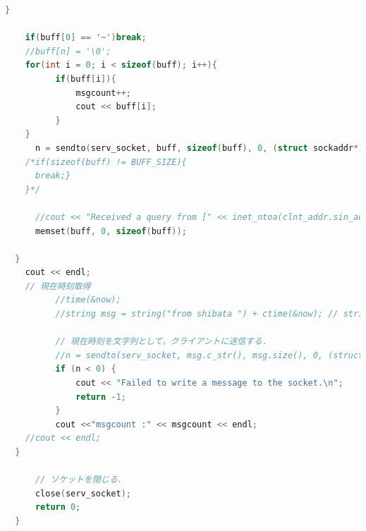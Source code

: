 \documentclass[fleqn, a4paper. 12pt]{ltjsarticle}
\begin{document}
\begin{lstlisting}[language=C++]
    }
    
    if(buff[0] == '~')break;
    //buff[n] = '\0';
    for(int i = 0; i < sizeof(buff); i++){
          if(buff[i]){
              msgcount++;
              cout << buff[i];
          }
    }
      n = sendto(serv_socket, buff, sizeof(buff), 0, (struct sockaddr*)&clnt_addr, sizeof(clnt_addr));
    /*if(sizeof(buff) != BUFF_SIZE){
      break;}
    }*/
  
      //cout << "Received a query from [" << inet_ntoa(clnt_addr.sin_addr) << ", " << htons(clnt_addr.sin_port) << "]" << endl;
      memset(buff, 0, sizeof(buff));
  
  }
    cout << endl;
    // 現在時刻取得
          //time(&now);
          //string msg = string("from shibata ") + ctime(&now); // string クラスは加算演算子で文字列を結合可能．
  
          // 現在時刻を文字列として，クライアントに送信する．
          //n = sendto(serv_socket, msg.c_str(), msg.size(), 0, (struct sockaddr*)&clnt_addr, sizeof(clnt_addr));
          if (n < 0) {
              cout << "Failed to write a message to the socket.\n";
              return -1;
          }
          cout <<"msgcount :" << msgcount << endl;
    //cout << endl;
  }
  
      // ソケットを閉じる．
      close(serv_socket);
      return 0;
  }
\end{lstlisting}
\end{document}
